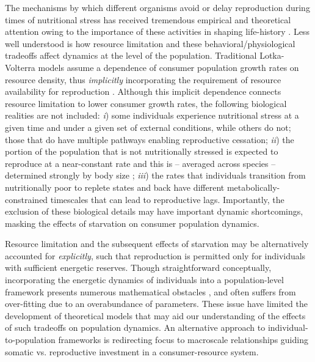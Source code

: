 \documentclass[12pt,english]{article}
\begin{document}
\begin{spacing}{1.9}
The mechanisms by which different organisms avoid or delay reproduction during times of nutritional stress has received tremendous empirical and theoretical attention owing to the importance of these activities in shaping life-history \citep{Cody:1966fk,Martin:1987dl,Mangel:1988uaa}.
Less well understood is how resource limitation and these behavioral/physiological tradeoffs affect dynamics at the level of the population.
Traditional Lotka-Volterra models assume a dependence of consumer population growth rates on resource density, thus \emph{implicitly} incorporating the requirement of resource availability for reproduction \citep{murdoch:2003}.
Although this implicit dependence connects resource limitation to lower consumer growth rates, the following biological realities are not included: 
\emph{i}) some individuals experience nutritional stress at a given time and under a given set of external conditions, while others do not; those that do have multiple pathways enabling reproductive cessation; 
\emph{ii}) the portion of the population that is not nutritionally stressed is expected to reproduce at a near-constant rate and this is -- averaged across species -- determined strongly by body size \citep{Kempes:2012hy};
\emph{iii}) the rates that individuals transition from nutritionally poor to replete states and back have different metabolically-constrained timescales that can lead to reproductive lags.
Importantly, the exclusion of these biological details may have important dynamic shortcomings, masking the effects of starvation on consumer population dynamics.


Resource limitation and the subsequent effects of starvation may be alternatively accounted for \emph{explicitly}, such that reproduction is permitted only for individuals with sufficient energetic reserves.
Though straightforward conceptually, incorporating the energetic dynamics of individuals \citep{Kooi2000} into a population-level framework \citep{Kooi2000,Sousa:2010ez} presents numerous mathematical obstacles \citep[in particular a lack of smoothness, or differentiability;][]{Diekmann:2010da}, and often suffers from over-fitting due to an overabundance of parameters.
These issue have limited the development of theoretical models that may aid our understanding of the effects of such tradeoffs on population dynamics.
An alternative approach to individual-to-population frameworks is redirecting focus to macroscale relationships guiding somatic vs. reproductive investment in a consumer-resource system.


\end{spacing}
\end{document}
